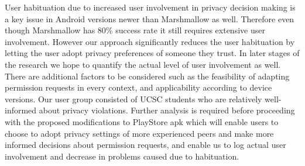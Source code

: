 User habituation due to increased user involvement in privacy decision making is a key issue in Android versions newer than Marshmallow as well. Therefore even though Marshmallow has 80\% success rate it still requires extensive user involvement. However our approach significantly reduces the user habituation by letting the user adopt privacy preferences of someone they trust. In later stages of the research we hope to quantify the actual level of user involvement as well. There are additional factors to be considered such as the feasibility of adapting permission requests in every context, and applicability according to device versions. Our user group consisted of UCSC students who are relatively well-informed about privacy violations. Further analysis is required before proceeding with the proposed modifications to PlayStore apk which will enable users to choose to adopt privacy settings of more experienced peers and make more informed decisions about permission requests, and enable us to log actual user involvement and decrease in problems caused due to habituation. 






